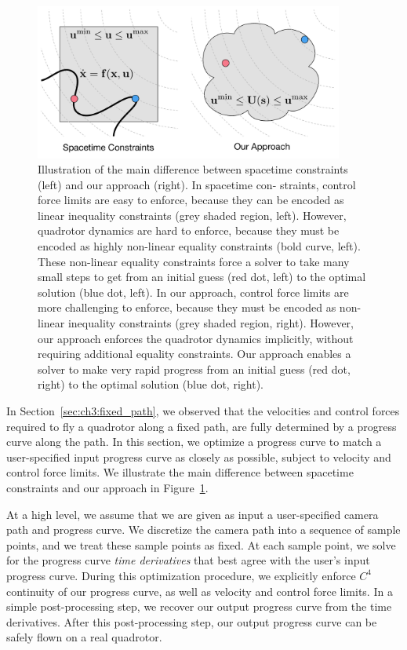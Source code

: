 \begin{figure}[t]
\centering
\includegraphics[width=4.0in]{images/2016_siggraph/22_optimization_problem_diagram.pdf}
\caption{
Illustration of the main difference between spacetime constraints (left) and our approach (right).
In spacetime con- straints, control force limits are easy to enforce, because they can be encoded as linear inequality constraints (grey shaded region, left).
However, quadrotor dynamics are hard to enforce, because they must be encoded as highly non-linear equality constraints (bold curve, left).
These non-linear equality constraints force a solver to take many small steps to get from an initial guess (red dot, left) to the optimal solution (blue dot, left).
In our approach, control force limits are more challenging to enforce, because they must be encoded as non-linear inequality constraints (grey shaded region, right).
However, our approach enforces the quadrotor dynamics implicitly, without requiring additional equality constraints.
Our approach enables a solver to make very rapid progress from an initial guess (red dot, right) to the optimal solution (blue dot, right).
}
\label{fig:ch3:optimization_problem_diagram}
\end{figure}

In Section~\ref{sec:ch3:fixed_path}, we observed that the velocities and control forces required to fly a quadrotor along a fixed path, are fully determined by a progress curve along the path.
In this section, we optimize a progress curve to match a user-specified input progress curve as closely as possible, subject to velocity and control force limits.
We illustrate the main difference between spacetime constraints and our approach in Figure~\ref{fig:ch3:optimization_problem_diagram}.

At a high level, we assume that we are given as input a user-specified camera path and progress curve. We discretize the camera path into a sequence of sample points, and we treat these sample points as fixed.
At each sample point, we solve for the progress curve \emph{time derivatives} that best agree with the user's input progress curve.
During this optimization procedure, we explicitly enforce $C^4$ continuity of our progress curve, as well as velocity and control force limits.
In a simple post-processing step, we recover our output progress curve from the time derivatives.
After this post-processing step,  our output progress curve can be safely flown on a real quadrotor.

